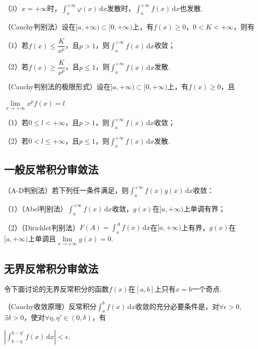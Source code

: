 \documentclass{ctexbook}
\begin{document}
	（3）$x=+\infty$时，$\displaystyle\int_{a}^{+\infty}\varphi(x)\,\mathrm{d} x$发散时，$\displaystyle\int_{a}^{+\infty}f(x)\,\mathrm{d} x$也发散.
	
	\hspace*{\fill}
	
	（Cauchy判别法）设在$[a,+\infty)\subset[0,+\infty)$上，有$f(x)\ge 0$，$0<K<+\infty$，则有
	
	（1）若$f(x)\le \dfrac{K}{x^p}$，且$p>1$，则$\displaystyle\int_{a}^{+\infty}f(x)\,\mathrm{d} x$收敛；
	
	（2）若$f(x)\ge \dfrac{K}{x^p}$，且$p\le1$，则$\displaystyle\int_{a}^{+\infty}f(x)\,\mathrm{d} x$发散.
	
	\hspace*{\fill}
	
	（Cauchy判别法的极限形式）设在$[a,+\infty)\subset[0,+\infty)$上，有$f(x)\ge 0$，且
	
	\centerline{$\lim\limits_{x\rightarrow +\infty}x^p f(x)=l$}
	
	（1）若$0\le l<+\infty$，且$p>1$，则$\displaystyle\int_{a}^{+\infty}f(x)\,\mathrm{d} x$收敛；
	
	（2）若$0< l\le +\infty$，且$p\le1$，则$\displaystyle\int_{a}^{+\infty}f(x)\,\mathrm{d} x$发散.
	
	\subsection*{一般反常积分审敛法}
	（A-D判别法）若下列任一条件满足，则$\displaystyle\int_{a}^{+\infty}f(x)g(x)\,\mathrm{d} x$收敛：
	
	（1）（Abel判别法）$\displaystyle\int_{a}^{+\infty}f(x)\,\mathrm{d} x$收敛，$g(x)$在$[a,+\infty)$上单调有界；
	
	（2）（Dirichlet判别法）$F(A)=\displaystyle\int_{a}^{A}f(x)\,\mathrm{d} x$在$[a,+\infty)$上有界，$g(x)$在$[a,+\infty)$上单调且$\lim\limits_{x\rightarrow +\infty}g(x)=0$.
	
	\subsection*{无界反常积分审敛法}
	令下面讨论的无界反常积分的函数$f(x)$在$[a,b]$上只有$x=b$一个奇点.
	
	（Cauchy收敛原理）反常积分$\displaystyle\int_{a}^{b}f(x)\,\mathrm{d} x$收敛的充分必要条件是，对$\forall \epsilon >0$,$\exists \delta > 0$，使对$\forall \eta,\eta' \in (0,\delta)$，有
	
	\centerline{$|\displaystyle\int_{b-\eta}^{b-\eta'}f(x)\,\mathrm{d} x|<\epsilon$.}
	
\end{document}
